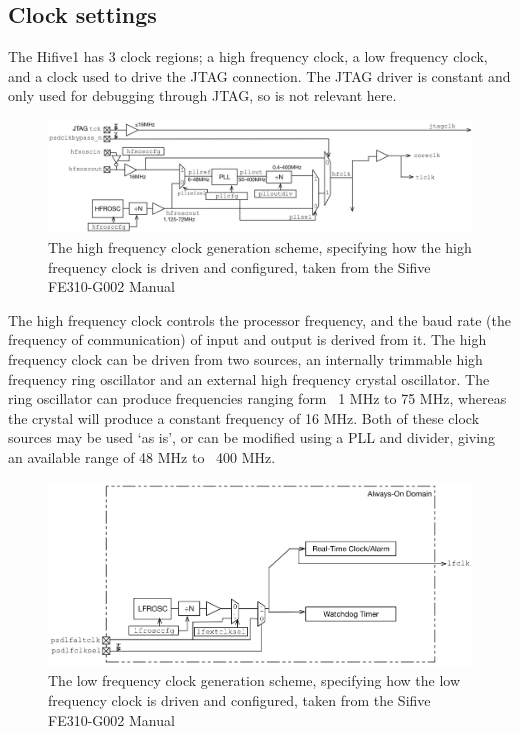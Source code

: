 \subsection{Clock settings}
The Hifive1 has 3 clock regions; a high frequency clock, a low frequency clock, and a clock used to drive the JTAG connection. The JTAG driver is constant and only used for debugging through JTAG, so is not relevant here.
\\

\begin{figure}[H]
    \includegraphics[width=0.9\columnwidth]{figures/hfclock.png}
    \centering
    \caption[High Frequency Clock Diagram]{The high frequency clock generation scheme, specifying how the high frequency clock is driven and configured, taken from the Sifive FE310-G002 Manual\cite{sifive_manual}}
\end{figure}
The high frequency clock controls the processor frequency, and the baud rate (the frequency of communication) of input and output is derived from it. The high frequency clock can be driven from two sources, an internally trimmable high frequency ring oscillator and an external high frequency crystal oscillator. The ring oscillator can produce frequencies ranging form ~1 MHz to 75 MHz, whereas the crystal will produce a constant frequency of 16 MHz. Both of these clock sources may be used `as is', or can be modified using a PLL and divider, giving an available range of 48 MHz to ~400 MHz. 
\\
\begin{figure}[H]
    \includegraphics[width=0.9\columnwidth]{figures/lfclock.png}
    \centering
    \caption[Low Frequency Clock Diagram]{The low frequency clock generation scheme, specifying how the low frequency clock is driven and configured, taken from the Sifive FE310-G002 Manual\cite{sifive_manual}}
\end{figure}

